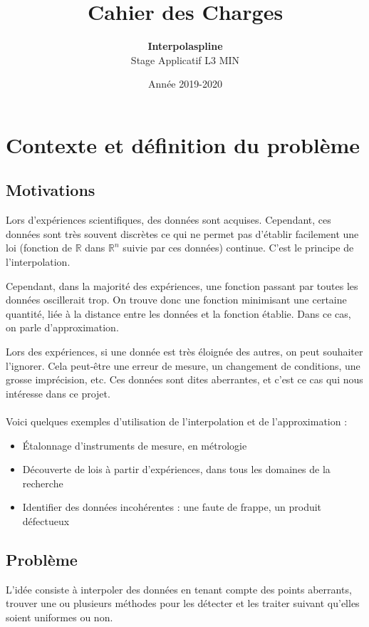 \documentclass[a4paper,12pt]{article}
\title{Cahier des Charges}
\author{\textbf{Interpolaspline}\\Stage Applicatif L3 MIN}
\date{Année 2019-2020}
\newcommand{\IKex}[2]{\mathbb{#1}^{#2}}
\newcommand{\IK}[1]{\mathbb{#1}}
\newcommand{\IRex}[1]{\IKex{R}{#1}}
\newcommand{\IR}{\IK{R}}
\begin{document}
\maketitle
\tableofcontents

\newpage

\section{Contexte et définition du problème}

\subsection{Motivations}

Lors d'expériences scientifiques, des données sont acquises. Cependant, ces données sont très souvent discrètes ce qui ne permet pas d'établir facilement une loi (fonction de $\IR$ dans $\IRex{n}$ suivie par ces données) continue. C'est le principe de l'interpolation.

Cependant, dans la majorité des expériences, une fonction passant par toutes les données oscillerait trop. On trouve donc une fonction minimisant une certaine quantité, liée à la distance entre les données et la fonction établie. Dans ce cas, on parle d'approximation.

Lors des expériences, si une donnée est très éloignée des autres, on peut souhaiter l'ignorer. Cela peut-être une erreur de mesure, un changement de conditions, une grosse imprécision, etc. Ces données sont dites aberrantes, et c'est ce cas qui nous intéresse dans ce projet.
\\ \\
Voici quelques exemples d'utilisation de l'interpolation et de l'approximation :
\begin{itemize}
\item Étalonnage d'instruments de mesure, en métrologie
\item Découverte de lois à partir d'expériences, dans tous les domaines de la recherche
\item Identifier des données incohérentes : une faute de frappe, un produit défectueux
\end{itemize}


\subsection{Problème}

L’idée consiste à interpoler des données en tenant compte des points aberrants, trouver une ou plusieurs méthodes pour les détecter et les traiter suivant qu’elles soient uniformes ou non.
\end{document}
